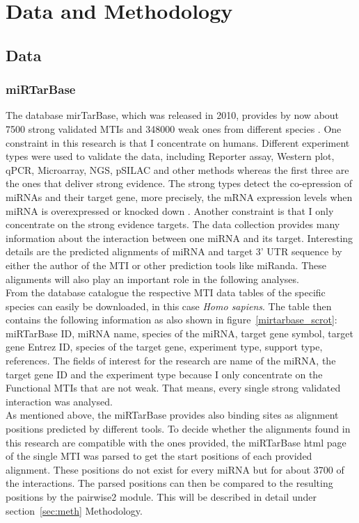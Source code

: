 \documentclass[12pt,  a4paper]{report}
\begin{document}
\vspace{1.5cm}


\chapter{Data and Methodology}
\label{chapter:data and methodology}

 
\section{Data} 
\subsection{miRTarBase}
The database mirTarBase, which was released in 2010, provides by now about 7500 strong validated MTIs and 348000 weak ones from different species \cite{Chou}. One constraint in this research is that I concentrate on humans. Different experiment types were used to validate the data, including Reporter assay, Western plot, qPCR, Microarray, NGS, pSILAC and other methods whereas the first three are the ones that deliver strong evidence. The strong types detect the co-epression of miRNAs and their target gene, more precisely, the mRNA expression levels when miRNA is overexpressed or knocked down  \cite{Hsu}. Another constraint is that I only concentrate on the strong evidence targets. The data collection provides many information about the interaction between one miRNA and its target. Interesting details are the predicted alignments of miRNA and target 3' UTR sequence by either the author of the MTI or other prediction tools like miRanda. These alignments will also play an important role in the following analyses. \\

From the database catalogue the respective MTI data tables of the specific species can easily be downloaded, in this case \textit{Homo sapiens}. The table then contains the following information as also shown in figure~\ref{mirtarbase_scrot}: miRTarBase ID, miRNA name, species of the miRNA, target gene symbol, target gene Entrez ID, species of the target gene, experiment type, support type, references. The fields of interest for the research are name of the miRNA, the target gene ID and the experiment type because I only concentrate on the Functional MTIs that are not weak. That means, every single strong validated interaction was analysed.\\

As mentioned above, the miRTarBase provides also binding sites as alignment positions predicted by different tools. To decide whether the alignments found in this research are compatible with the ones provided, the miRTarBase html page of the single MTI was parsed to get the start positions of each provided alignment. These positions do not exist for every miRNA but for about 3700 of the interactions. The parsed positions can then be compared to the resulting positions by the pairwise2 module. This will be described in detail under section~\ref{sec:meth} Methodology.\\ 
\end{document}
